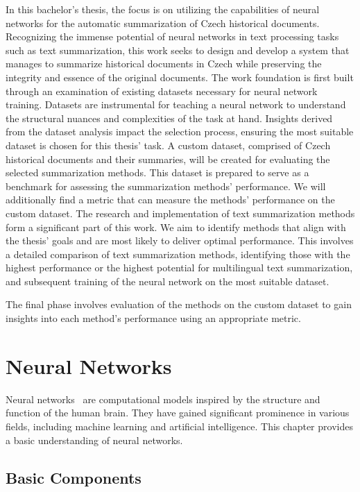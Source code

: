 \documentclass[english, ba, kiv, he, iso690numb, pdf, viewonly]{fasthesis}
\begin{document}
In this bachelor's thesis, the focus is on utilizing the capabilities of neural networks for the automatic summarization of Czech historical documents. Recognizing the immense potential of neural networks in text processing tasks such as text summarization, this work seeks to design and develop a system that manages to summarize historical documents in Czech while preserving the integrity and essence of the original documents. The work foundation is first built through an examination of existing datasets necessary for neural network training. Datasets are instrumental for teaching a neural network to understand the structural nuances and complexities of the task at hand. Insights derived from the dataset analysis impact the selection process, ensuring the most suitable dataset is chosen for this thesis' task. A custom dataset, comprised of Czech historical documents and their summaries, will be created for evaluating the selected summarization methods. This dataset is prepared to serve as a benchmark for assessing the summarization methods' performance. We will additionally find a metric that can measure the methods' performance on the custom dataset. The research and implementation of text summarization methods form a significant part of this work. We aim to identify methods that align with the thesis' goals and are most likely to deliver optimal performance. This involves a detailed comparison of text summarization methods, identifying those with the highest performance or the highest potential for multilingual text summarization, and subsequent training of the neural network on the most suitable dataset.

The final phase involves evaluation of the methods on the custom dataset to gain insights into each method's performance using an appropriate metric.


%
%
%
%
\chapter{Neural Networks}
Neural networks~\cite{goodfellow2016deep} are computational models inspired by the structure and function of the human brain. They have gained significant prominence in various fields, including machine learning and artificial intelligence. This chapter provides a basic understanding of neural networks.

\section{Basic Components}
\end{document}
